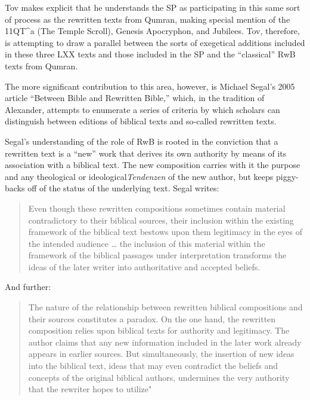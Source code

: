 Tov makes explicit that he understands the SP as participating in this
same sort of process as the rewritten texts from Qumran, making special
mention of the 11QT\^{}a (The Temple Scroll), Genesis Apocryphon, and
Jubilees. Tov, therefore, is attempting to draw a parallel between the
sorts of exegetical additions included in these three LXX texts and
those included in the SP and the ``classical'' RwB texts from Qumran.

The more significant contribution to this area, however, is Michael
Segal's 2005 article ``Between Bible and Rewritten Bible,'' which, in
the tradition of Alexander, attempts to enumerate a series of criteria
by which scholars can distinguish between editions of biblical texts and
so-called rewritten texts.

Segal's understanding of the role of RwB is rooted in the conviction
that a rewritten text is a ``new'' work that derives its own authority
by means of its association with a biblical text. The new composition
carries with it the purpose and any theological or
ideological\emph{Tendenzen} of the new author, but keeps piggy-backs off
of the status of the underlying text.\autocite[11]{segal_henze2005}
Segal writes:

\begin{quote}
Even though these rewritten compositions sometimes contain material
contradictory to their biblical sources, their inclusion within the
existing framework of the biblical text bestows upon them legitimacy in
the eyes of the intended audience \ldots{} the inclusion of this
material within the framework of the biblical passages under
interpretation transforms the ideas of the later writer into
authoritative and accepted beliefs. \autocite[11]{segal_henze2005}
\end{quote}

And further:

\begin{quote}
The nature of the relationship between rewritten biblical compositions
and their sources constitutes a paradox. On the one hand, the rewritten
composition relies upon biblical texts for authority and legitimacy. The
author claims that any new information included in the later work
already appears in earlier sources. But simultaneously, the insertion of
new ideas into the biblical text, ideas that may even contradict the
beliefs and concepts of the original biblical authors, undermines the
very authority that the rewriter hopes to utilize"
\autocite[11-12]{segal_henze2005}
\end{quote}

